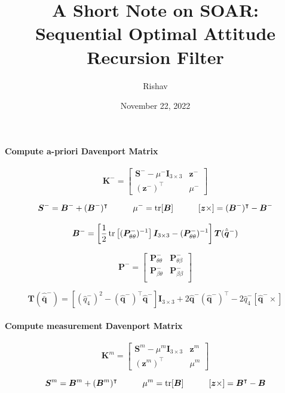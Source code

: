 \documentclass{article}
\title{A Short Note on SOAR:\\ Sequential Optimal Attitude Recursion Filter}
\author{Rishav}
\date{November 22, 2022}
\begin{document}
\maketitle

\paragraph{Compute a-priori Davenport Matrix}

$$
  \bm{K}^{-} =
  \begin{bmatrix}
    \bm{S}^{-} - \mu^{-}\bm{I}_{3\times 3} & \bm{z}^{-} \\
    (\bm{z}^{-})^{\intercal} & \mu^{-}
  \end{bmatrix}
$$

$$
  \bm{S}^{-} = \bm{B}^{-} + (\bm{B}^{-})^{\intercal}
  \quad\quad\quad
  \mu^{-} = \textnormal{tr}[\bm{B}\textnormal]
  \quad\quad\quad
  [\bm{z}\times] = (\bm{B}^{-})^{\intercal} - \bm{B}^{-}
$$

$$
  \bm{B}^{-} = \left[\frac{1}{2}\,\textnormal{tr}\left[(\bm{P}_{\theta\theta}^{-})^{-1}\right]\bm{I}_{3\times 3} - (\bm{P}_{\theta\theta}^{-})^{-1}\right]\bm{T}(\hat{\bar{\bm{q}}}^{-})
$$

$$
  \bm{P}^{-} =
  \begin{bmatrix}
    \bm{P}_{\theta\theta}^{-} & \bm{P}_{\theta\beta}^{-} \\
    \bm{P}_{\beta\theta}^{-} & \bm{P}_{\beta\beta}^{-} \\
  \end{bmatrix}
$$

$$
  \bm{T}(\hat{\bar{\bm{q}}}^{-}) = [(\hat{q}^{-}_{4})^{2} - (\hat{\bm{q}}^{-})^{\intercal}\hat{\bm{q}}^{-}]\bm{I}_{3\times 3} + 2\hat{\bm{q}}^{-}(\hat{\bm{q}}^{-})^{\intercal} - 2\hat{q}^{-}_{4}[\hat{\bm{q}}^{-}\times]
$$

\paragraph{Compute measurement Davenport Matrix}

$$
  \bm{K}^{m} =
  \begin{bmatrix}
    \bm{S}^{m} - \mu^{m}\bm{I}_{3\times 3} & \bm{z}^{m} \\
    (\bm{z}^{m})^{\intercal} & \mu^{m}
  \end{bmatrix}
$$

$$
  \bm{S}^{m} = \bm{B}^{m} + (\bm{B}^{m})^{\intercal}
  \quad\quad\quad
  \mu^{m} = \textnormal{tr}[\bm{B}\textnormal]
  \quad\quad\quad
  [\bm{z}\times] = \bm{B}^{\intercal} - \bm{B}
$$
\end{document}
